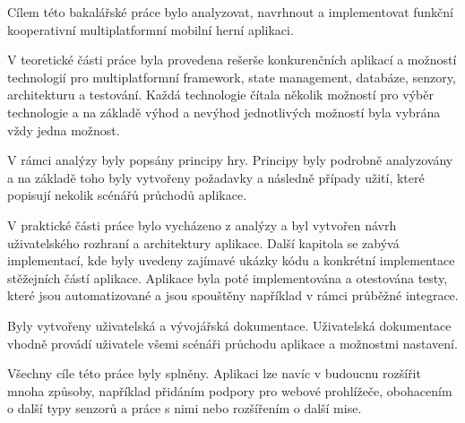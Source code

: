 \begin{conclusion}
Cílem této bakalářské práce bylo analyzovat, navrhnout a implementovat
funkční kooperativní multiplatformní mobilní herní aplikaci. 

V teoretické části práce byla provedena rešerše konkurenčních aplikací
a možností technologií pro multiplatformní framework, state management,
databáze, senzory, architekturu a testování.
Každá technologie čítala několik možností pro výběr technologie
a na základě výhod a nevýhod jednotlivých možností byla vybrána vždy
jedna možnost.

V rámci analýzy byly popsány principy hry.
Principy byly podrobně analyzovány a na základě toho byly vytvořeny
požadavky a následně případy užití,
které popisují nekolik scénářů průchodů aplikace.

V praktické části práce bylo vycházeno z analýzy
a byl vytvořen návrh uživatelského rozhraní
a architektury aplikace.
Další kapitola se zabývá implementací,
kde byly uvedeny zajímavé ukázky kódu
a konkrétní implementace stěžejních částí aplikace.
Aplikace byla poté implementována a otestována testy,
které jsou automatizované a jsou spouštěny například v rámci průběžné integrace.

Byly vytvořeny uživatelská a vývojářská dokumentace.
Uživatelská dokumentace vhodně provádí uživatele všemi scénáři průchodu
aplikace a možnostmi nastavení. 

Všechny cíle této práce byly splněny.
Aplikaci lze navíc v budoucnu rozšířit mnoha způsoby,
například přidáním podpory pro webové prohlížeče,
obohacením o další typy senzorů a práce s nimi
nebo rozšířením o další mise.
\end{conclusion}
